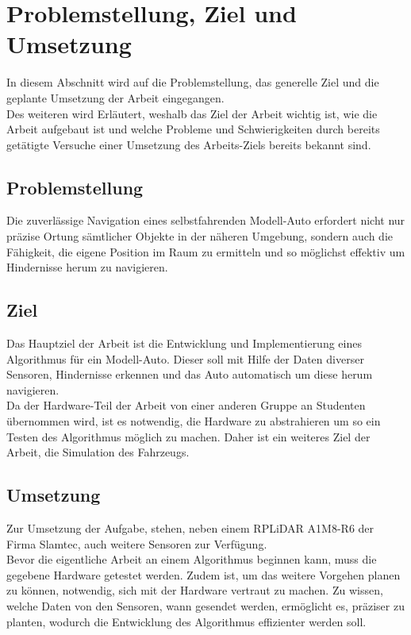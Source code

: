 \section{Problemstellung, Ziel und Umsetzung}
In diesem Abschnitt wird auf die Problemstellung, das generelle Ziel und die geplante Umsetzung der Arbeit eingegangen. \\
Des weiteren wird Erläutert, weshalb das Ziel der Arbeit wichtig ist, wie die Arbeit aufgebaut ist und welche Probleme und Schwierigkeiten durch bereits getätigte Versuche einer Umsetzung des Arbeits-Ziels bereits bekannt sind.

\subsection{Problemstellung}
Die zuverlässige Navigation eines selbstfahrenden Modell-Auto erfordert nicht nur präzise Ortung sämtlicher Objekte in der näheren Umgebung, sondern auch die Fähigkeit, die eigene Position im Raum zu ermitteln und so möglichst effektiv um Hindernisse herum zu navigieren. \\



\subsection{Ziel}
Das Hauptziel der Arbeit ist die Entwicklung und Implementierung eines Algorithmus für ein Modell-Auto. Dieser soll mit Hilfe der Daten diverser Sensoren, Hindernisse
erkennen und das Auto automatisch um diese herum navigieren. \\


Da der Hardware-Teil der Arbeit von einer anderen Gruppe an Studenten übernommen wird, ist es notwendig, die Hardware zu abstrahieren um so ein Testen des Algorithmus möglich zu machen. Daher ist ein weiteres Ziel der Arbeit, die Simulation des Fahrzeugs.

\subsection{Umsetzung}
Zur Umsetzung der Aufgabe, stehen, neben einem RPLiDAR A1M8-R6 der Firma Slamtec, auch weitere Sensoren zur Verfügung. \\

Bevor die eigentliche Arbeit an einem Algorithmus beginnen kann, muss die gegebene Hardware getestet werden.
Zudem ist, um das weitere Vorgehen planen zu können, notwendig, sich mit der Hardware vertraut zu machen.
Zu wissen, welche Daten von den Sensoren, wann gesendet werden, ermöglicht es, präziser zu planten, wodurch die Entwicklung des Algorithmus effizienter werden soll. \\


